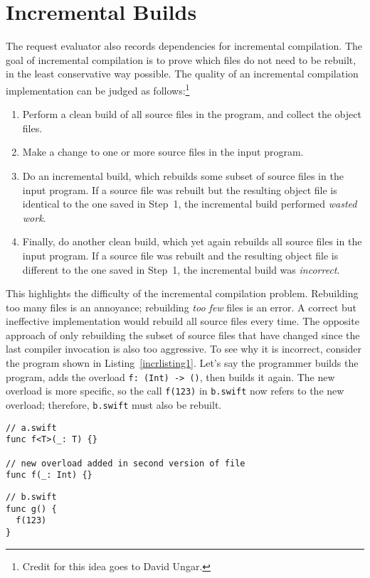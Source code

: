 \documentclass[a4paper,headsepline,bibliography=totoc,toc=flat,fleqn,twoside=semi]{scrbook}
\theoremstyle{definition}
\theoremstyle{definition}
\theoremstyle{definition}
\begin{document}
\section{Incremental Builds}\label{incremental builds}
The request evaluator also records dependencies for incremental compilation. The goal of incremental compilation is to prove which files do not need to be rebuilt, in the least conservative way possible. The quality of an incremental compilation implementation can be judged as follows:\footnote{Credit for this idea goes to David Ungar.}
\begin{enumerate}
\item Perform a clean build of all source files in the program, and collect the object files.
\item Make a change to one or more source files in the input program.
\item Do an incremental build, which rebuilds some subset of source files in the input program. If a source file was rebuilt but the resulting object file is identical to the one saved in Step~1, the incremental build performed \emph{wasted work}.
\item Finally, do another clean build, which yet again rebuilds all source files in the input program. If a source file was rebuilt and the resulting object file is different to the one saved in Step~1, the incremental build was \emph{incorrect}.
\end{enumerate}
This highlights the difficulty of the incremental compilation problem. Rebuilding too many files is an annoyance; rebuilding \emph{too few} files is an error. A correct but ineffective implementation would rebuild all source files every time. The opposite approach of only rebuilding the subset of source files that have changed since the last compiler invocation is also too aggressive. To see why it is incorrect, consider the program shown in Listing~\ref{incrlisting1}. Let's say the programmer builds the program, adds the overload \verb|f: (Int) -> ()|, then builds it again. The new overload is more specific, so the call \texttt{f(123)} in \texttt{b.swift} now refers to the new overload; therefore, \texttt{b.swift} must also be rebuilt.
\begin{listing}\label{incrlisting1}
\begin{Verbatim}
// a.swift
func f<T>(_: T) {}

// new overload added in second version of file
func f(_: Int) {}
\end{Verbatim}
\begin{Verbatim}
// b.swift
func g() {
  f(123)
}
\end{Verbatim}
\end{listing}
\end{document}
